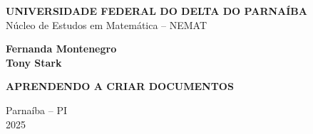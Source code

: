 \documentclass[12pt,a4paper]{article}
\begin{document}
\begin{titlepage}
    \begin{center}
        \onehalfspacing
        
        \textbf{UNIVERSIDADE FEDERAL DO DELTA DO PARNAÍBA} \\
        Núcleo de Estudos em Matemática – NEMAT
        
        \vspace{4cm}
        \textbf{Fernanda Montenegro} \\
        \textbf{Tony Stark}
        
        \vspace{4cm}
        \textbf{\LARGE APRENDENDO A CRIAR DOCUMENTOS}
        
        
        
        \vfill
        Parnaíba – PI \\
        2025
    \end{center}
\end{titlepage}
\end{document}
